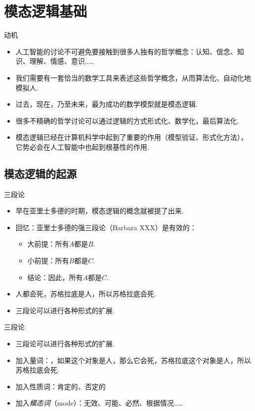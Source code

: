 \chapter{模态逻辑基础}\label{chap:modal-logic}


\begin{frame}{动机}
    \begin{itemize}
        \item 人工智能的讨论不可避免要接触到很多人独有的哲学概念：认知、信念、知识、理解、情感、意识……
        \item 我们需要有一套恰当的数学工具来表述这些哲学概念，从而算法化、自动化地模拟人.
        \item 过去，现在，乃至未来，最为成功的数学模型就是模态逻辑.
        \item 很多不精确的哲学讨论可以通过逻辑的方式形式化、数学化，最后算法化.
        \item 模态逻辑已经在计算机科学中起到了重要的作用（模型验证、形式化方法），它势必会在人工智能中也起到根基性的作用.
    \end{itemize}
    \end{frame}
    
    \section{模态逻辑的起源}
    
    \begin{frame}{三段论}
    \begin{itemize}
        \item 早在亚里士多德的时期，模态逻辑的概念就被提了出来.
        \item 回忆：亚里士多德的强三段论（Barbara XXX）是有效的：
        \begin{itemize}
            \item 大前提：所有$A$都是$B$.
            \item 小前提：所有$B$都是$C$.
            \item 结论：因此，所有$A$都是$C$.
        \end{itemize}
    
        \item 人都会死，苏格拉底是人，所以苏格拉底会死.
        \item 三段论可以进行各种形式的扩展.
    \end{itemize}
    \end{frame}
    
    \begin{frame}{三段论}
    \begin{itemize}
        \item 三段论可以进行各种形式的扩展.
        \item 加入量词：，如果这个对象是人，那么它会死，苏格拉底这个对象是人，所以苏格拉底会死.
        \item 加入性质词：肯定的、否定的
        \item 加入\emph{模态词}（mode）：无效、可能、必然、根据情况……
    \end{itemize}
    \end{frame}
    

